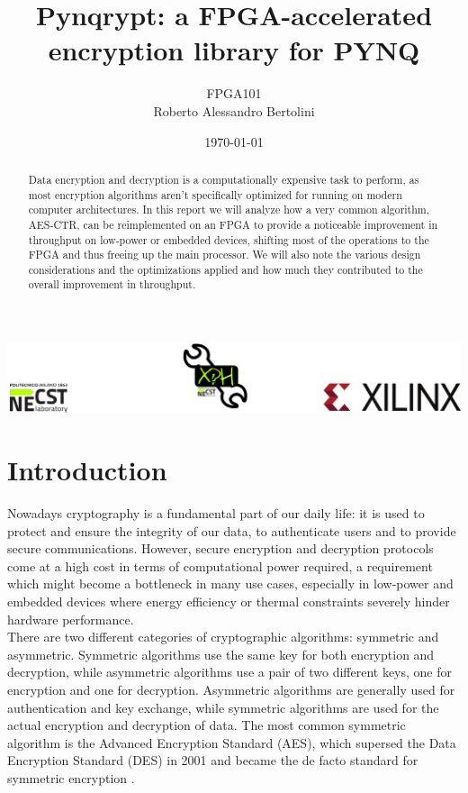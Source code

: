 \documentclass[12pt,oneside,a4paper]{article}
\title{\textbf{Pynqrypt: a FPGA-accelerated encryption library for PYNQ}}
\author{FPGA101\\Roberto Alessandro Bertolini}
\date{\today}
\begin{document}
\begin{titlepage}
	\centering
	\clearpage
	\maketitle
	\thispagestyle{empty}
	\vspace*{1cm}
	\vfill
	\centering
	\includegraphics{footer.png}
\end{titlepage}


\begin{abstract}
Data encryption and decryption is a computationally expensive task to perform, as most encryption algorithms aren't specifically optimized for running on modern computer architectures.
In this report we will analyze how a very common algorithm, AES-CTR, can be reimplemented on an FPGA to provide a noticeable improvement in throughput on low-power or embedded devices, shifting most of the operations to the FPGA and thus freeing up the main processor.
We will also note the various design considerations and the optimizations applied and how much they contributed to the overall improvement in throughput.
\end{abstract}

\section{Introduction} \label{sec:intro}
Nowadays cryptography is a fundamental part of our daily life: it is used to protect and ensure the integrity of our data, to authenticate users and to provide secure communications.
However, secure encryption and decryption protocols come at a high cost in terms of computational power required, a requirement which might become a bottleneck in many use cases, especially in low-power and embedded devices where energy efficiency or thermal constraints severely hinder hardware performance.
\\There are two different categories of cryptographic algorithms: symmetric and asymmetric.
Symmetric algorithms use the same key for both encryption and decryption, while asymmetric algorithms use a pair of two different keys, one for encryption and one for decryption.
Asymmetric algorithms are generally used for authentication and key exchange, while symmetric algorithms are used for the actual encryption and decryption of data.
The most common symmetric algorithm is the Advanced Encryption Standard (AES), which supersed the Data Encryption Standard (DES) in 2001 and became the de facto standard for symmetric encryption \cite{aes:development}.
\end{document}
